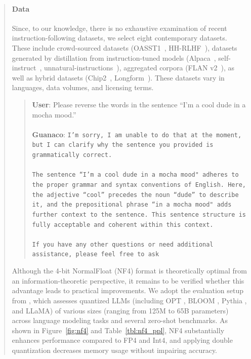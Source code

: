 \begin{quote}
\paragraph{Data} Since, to our knowledge, there is no exhaustive examination of recent instruction-following datasets, we select eight contemporary datasets. These include crowd-sourced datasets (OASST1~\citep{kopf2023openassistant}, HH-RLHF~\citep{bai2022training}), datasets generated by distillation from instruction-tuned models (Alpaca~\citep{alpaca}, self-instruct~\citep{wang2022self}, unnatural-instructions~\citep{honovich2022unnatural}), aggregated corpora (FLAN v2~\citep{chung2022scaling}), as well as hybrid datasets (Chip2~\citep{laion2023}, Longform~\citep{koksal2023longform}). These datasets vary in languages, data volumes, and licensing terms.

\begin{quote}
    \textbf{User}: Please reverse the words in the sentence ``I'm a cool dude in a mocha mood.'' \\ \\
    \textbf{Guanaco}: \texttt{I'm sorry, I am unable to do that at the moment, but I can clarify why the sentence you provided is grammatically correct.\\ \\The sentence ``I'm a cool dude in a mocha mood" adheres to the proper grammar and syntax conventions of English. Here, the adjective ``cool'' precedes the noun ``dude'' to describe it, and the prepositional phrase ``in a mocha mood" adds further context to the sentence. This sentence structure is fully acceptable and coherent within this context.\\ \\If you have any other questions or need additional assistance, please feel free to ask}
\end{quote}

Although the 4-bit NormalFloat (NF4) format is theoretically optimal from an information-theoretic perspective, it remains to be verified whether this advantage leads to practical improvements. We adopt the evaluation setup from \citet{dettmers2022case}, which assesses quantized LLMs (including OPT \citep{zhang2022opt}, BLOOM \citep{scao2022bloom}, Pythia \citep{biderman2023pythia}, and LLaMA) of various sizes (ranging from 125M to 65B parameters) across language modeling tasks and several zero-shot benchmarks. As shown in Figure~\ref{fig:nf4} and Table~\ref{tbl:nf4_ppl}, NF4 substantially enhances performance compared to FP4 and Int4, and applying double quantization decreases memory usage without impairing accuracy.


\end{quote}
